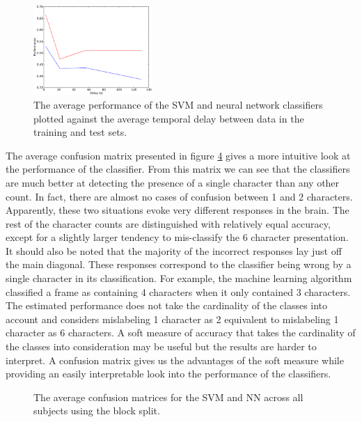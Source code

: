\documentclass[preprint,5p,authoryear]{elsarticle}
\begin{document}
\begin{figure}
\centering
\includegraphics[width=0.4\textwidth]{figures/performance-verse-temporal-distance}
\caption{The average performance of the SVM and neural network classifiers plotted against the average temporal delay between data in the training and test sets.}
\label{fig:performance-verse-temporal-distance}
\end{figure}

The average confusion matrix presented in figure \ref{fig:average-confusion} gives a more intuitive look at the performance of the classifier.
From this matrix we can see that the classifiers are much better at detecting the presence of a single character than any other count.
In fact, there are almost no cases of confusion between 1 and 2 characters.
Apparently, these two situations evoke very different responses in the brain.
The rest of the character counts are distinguished with relatively equal accuracy,
except for a slightly larger tendency to mis-classify the 6 character presentation.
It should also be noted that the majority of the incorrect responses lay just off the main diagonal.
These responses correspond to the classifier being wrong by a single character in its classification.
For example, the machine learning algorithm classified a frame as containing 4 characters when it only contained 3 characters.
The estimated performance does not take the cardinality of the classes into account and considers mislabeling 1 character as 2 equivalent to mislabeling 1 character as 6 characters.
A soft measure of accuracy that takes the cardinality of the classes into consideration may be useful but the results are harder to interpret.
A confusion matrix gives us the advantages of the soft measure while providing an easily interpretable look into the performance of the classifiers.

\begin{figure}
\centering
\begin{subfigure}{0.4\textwidth}
\centering

\caption{}
\label{fig:average-confusion-svm}
\end{subfigure}
\begin{subfigure}{0.4\textwidth}
\centering

\caption{}
\label{fig:average-confusion-nn}
\end{subfigure}
\caption{The average confusion matrices for the  SVM and  NN across all subjects using the block split.}
\label{fig:average-confusion}
\end{figure}
\end{document}
